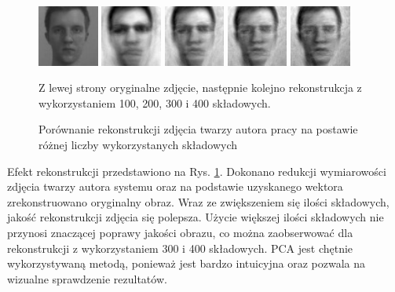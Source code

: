 \documentclass[oneside, eng]{mgr}
\begin{document}
\begin{figure}
\centering
	\parbox{2cm}{
		\includegraphics[width=2cm]{face_1.jpg}
		}
		\qquad
		\begin{minipage}{2cm}
			\includegraphics[width=2cm]{100.jpg}
		\end{minipage}
		\begin{minipage}{2cm}
			\includegraphics[width=2cm]{200.jpg}
		\end{minipage}
		\begin{minipage}{2cm}
			\includegraphics[width=2cm]{300.jpg}
		\end{minipage}
		\begin{minipage}{2cm}
			\includegraphics[width=2cm]{400.jpg}
		\end{minipage}
	\caption{Porównanie rekonstrukcji zdjęcia twarzy autora pracy na postawie różnej liczby wykorzystanych składowych} 
	Z lewej strony oryginalne zdjęcie, następnie kolejno rekonstrukcja z wykorzystaniem 100, 200, 300 i 400 składowych.
	\label{fig:rekonstrukcja}
\end{figure}

Efekt rekonstrukcji przedstawiono na Rys. \ref{fig:rekonstrukcja}. Dokonano redukcji wymiarowości zdjęcia twarzy autora systemu oraz na podstawie uzyskanego wektora zrekonstruowano oryginalny obraz. Wraz ze zwiększeniem się ilości składowych, jakość rekonstrukcji zdjęcia się polepsza. Użycie większej ilości składowych nie przynosi znaczącej poprawy jakości obrazu, co można zaobserwować dla rekonstrukcji z wykorzystaniem 300 i 400 składowych. PCA jest chętnie wykorzystywaną metodą, ponieważ jest bardzo intuicyjna oraz pozwala na wizualne sprawdzenie rezultatów.
\end{document}
